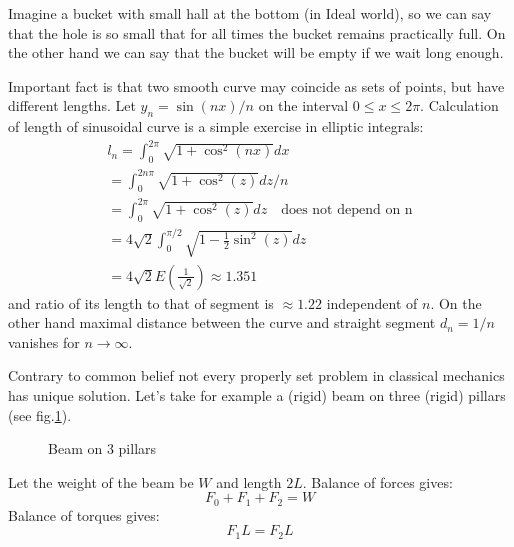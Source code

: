Imagine a bucket with small hall at the bottom (in Ideal world),
so we can say that the hole is so small that for all times the bucket remains practically full.
On the other hand we can say that the bucket will be empty if we wait long enough.

Important fact is that two smooth curve may coincide as sets of points, but have
different lengths. Let $ y_n= \sin(n x)/n $ on the  interval $ 0\le x \le 2 \pi $. 
Calculation of length of sinusoidal curve is a simple exercise in elliptic integrals:
\begin{equation}
   \label {sin-length}
   \begin{split}
       l_n=\int_0^{2 \pi}\sqrt{1+\cos^2(nx)}dx\\
       =\int_0^{2 n \pi}\sqrt{1+\cos^2(z)}dz/n\\
       =\int_0^{2 \pi}\sqrt{1+\cos^2(z)}dz\quad \text{does not depend on n}  \\
       =4 \sqrt{2} \int_0^{\pi/2}\sqrt{1-\frac{1}{2} \sin^2(z)}dz\\
       =4 \sqrt{2} E(\frac{1}{\sqrt{2}}) \approx 1.351
   \end{split}
\end{equation}  
and ratio of its length to that of segment is $ \approx 1.22 $ independent of $ n $.
On the other hand maximal distance between the curve and straight segment $ d_n=1/n $ 
vanishes for $ n\rightarrow \infty $.

Contrary to common belief not every properly set problem in
classical mechanics has unique solution. Let's take for example
a (rigid) beam on three (rigid) pillars (see fig.\ref{beam3}).
\begin{figure}[h]
\caption{Beam on 3 pillars}
\label {beam3}
\end{figure}
Let the weight of the beam be $W$ and length $2 L$.
Balance of forces gives:
\begin{equation}
        F_0+F_1+F_2=W \label {bf}
\end{equation}
Balance of torques gives:
\begin{equation}
        F_1 L=F_2 L \label {bt}
\end{equation}


